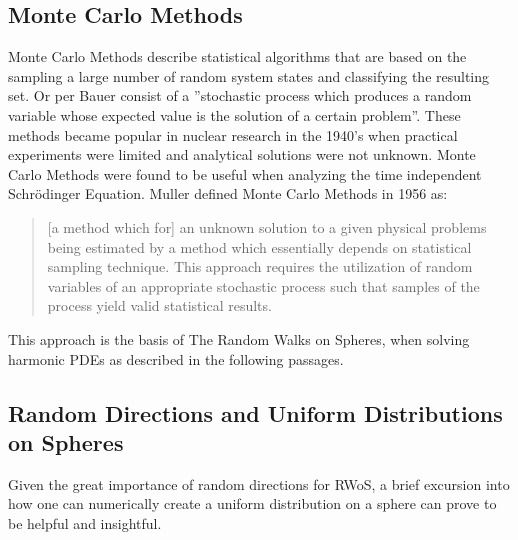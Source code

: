 \subsection{Monte Carlo Methods}\label{sssec:montecarlo}
Monte Carlo Methods describe statistical algorithms that are based on the sampling a
large number of random system states and classifying the resulting set\cite{Metropolis}.
Or per Bauer consist of a ''stochastic process which produces a random variable
 whose expected value is the solution of a certain problem''\cite{bauer}.
These methods became popular in nuclear research in the 1940's when practical
experiments were limited and analytical solutions were not unknown.  Monte Carlo
Methods were found to be useful when analyzing the time independent Schrödinger
Equation\cite{Metropolis}. Muller defined Monte Carlo Methods in 1956 as:
\begin{quote}[a method which for] an unknown solution to a given physical
problems being estimated by a method which essentially depends on statistical sampling technique.
This approach requires the utilization of random variables of an appropriate
stochastic process such that samples of the process yield valid statistical
results\cite{Muller}.\end{quote}
This approach is the basis of The Random Walks on Spheres, when solving harmonic
\Glspl{PDE} as described in the following passages.
\subsection{Random Directions and Uniform Distributions on Spheres}
Given the great importance of random directions for \Gls{RWoS}, a brief excursion
into how one can numerically create a uniform distribution on a sphere can prove
to be helpful and insightful.
\cite{Yang,Muller1959,marsaglia1972}


